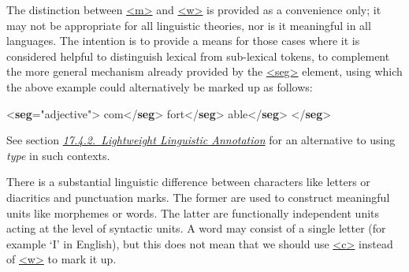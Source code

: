 The distinction between \hyperref[TEI.m]{<m>} and \hyperref[TEI.w]{<w>} is provided as a convenience only; it may not be appropriate for all linguistic theories, nor is it meaningful in all languages. The intention is to provide a means for those cases where it is considered helpful to distinguish lexical from sub-lexical tokens, to complement the more general mechanism already provided by the \hyperref[TEI.seg]{<seg>} element, using which the above example could alternatively be marked up as follows: \par\bgroup{}\exampleFont \begin{shaded}\noindent\mbox{}{<\textbf{seg}\hspace*{1em}{type}="{adjective}">}\mbox{}\newline 
{}\mbox{}\newline 
\hspace*{1em}com{</\textbf{seg}>}\mbox{}\newline 
\hspace*{1em}fort{</\textbf{seg}>}\mbox{}\newline 
{}\mbox{}\newline 
{}able{</\textbf{seg}>}\mbox{}\newline 
{</\textbf{seg}>}\end{shaded}\egroup\par \noindent  See section \textit{\hyperref[AILALW]{17.4.2.\ Lightweight Linguistic Annotation}} for an alternative to using {\itshape type} in such contexts.\par
There is a substantial linguistic difference between characters like letters or diacritics and punctuation marks. The former are used to construct meaningful units like morphemes or words. The latter are functionally independent units acting at the level of syntactic units. A word may consist of a single letter (for example ‘I’ in English), but this does not mean that we should use \hyperref[TEI.c]{<c>} instead of \hyperref[TEI.w]{<w>} to mark it up.\par
